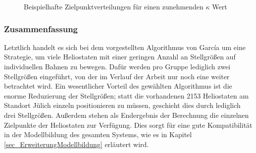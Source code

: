 \begin{figure}[h!]
    \centering
    \setlength{\fboxsep}{1pt}
    \setlength{\fboxrule}{1pt}
\caption[Beispielhafte Zielpunktverteilungen für einen zunehmenden $\kappa$ Wert]{Beispielhafte Zielpunktverteilungen für einen zunehmenden $\kappa$ Wert \cite[S.11]{Garcia2}}
    \label{fig_GarciaZielpunkte}
\end{figure}

\subsubsection*{Zusammenfassung} \label{subsubsec_Zusammenfassung}
Letztlich handelt es sich bei dem vorgestellten Algorithmus von García um eine Strategie, um viele Heliostaten mit einer geringen Anzahl an Stellgrößen auf individuellen Bahnen zu bewegen.
Dafür werden pro Gruppe lediglich zwei Stellgrößen eingeführt, von der im Verlauf der Arbeit nur noch eine weiter betrachtet wird.
Ein wesentlicher Vorteil des gewählten Algorithmus ist die enorme Reduzierung der Stellgrößen; statt die vorhandenen 2153 Heliostaten am Standort Jülich einzeln positionieren zu müssen, geschieht dies durch lediglich drei Stellgrößen.
Außerdem stehen als Endergebnis der Berechnung die einzelnen Zielpunkte der Heliostaten zur Verfügung.
Dies sorgt für eine gute Kompatibilität in der Modellbildung des gesamten Systems, wie es in Kapitel \ref{sec_ErweiterungModellbildung} erläutert wird.


